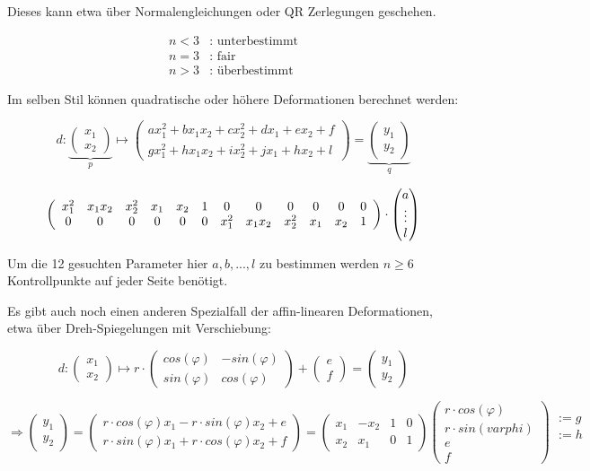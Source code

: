 \documentclass{article}
\theoremstyle{plain}
\theoremstyle{definition}
\numberwithin{equation}{section}
\newcommand{\C}[0]{
    \cdot
}
\newcommand{\x}[0] {
  \boldsymbol{x}
}
\newcommand{\y}[0] {
    \boldsymbol{y}
}
\newcommand{\mat}[1] {
\begin{pmatrix} #1 \end{pmatrix}
}
\begin{document}
Dieses kann etwa über Normalengleichungen oder QR Zerlegungen geschehen.

\begin{align*}
    n<3&\text{: unterbestimmt}\\
    n=3&\text{: fair}\\
    n>3&\text{: überbestimmt}
\end{align*}

Im selben Stil können quadratische oder höhere Deformationen berechnet werden:

\[d:\underbrace{\mat{x_1 \\ x_2}}_{p} \mapsto \mat{ax_1^2 + b x_1 x_2 + c x_2^2 + d x_1 + e x_2 +f\\ g x_1^2 + hx_1x_2 + ix_2^2 + jx_1 + hx_2 +l} = \underbrace{\mat{y_1\\y_2}}_{q}\]

\[\left(
    \begin{array}{*{12}c}
        x_1^2 & x_1x_2 & x_2^2 & x_1 & x_2 & 1 & 0 & 0 & 0 & 0 & 0 & 0\\
        0 & 0 & 0 & 0 & 0 & 0 & x_1^2 & x_1x_2 & x_2^2 & x_1 & x_2 & 1
    \end{array}
    \right) \C \mat{a\\ \vdots \\ l}\]

Um die 12 gesuchten Parameter hier $a,b, ... ,l$ zu bestimmen werden $n \geq 6$ Kontrollpunkte auf jeder Seite benötigt.

Es gibt auch noch einen anderen Spezialfall der affin-linearen Deformationen, etwa über Dreh-Spiegelungen mit Verschiebung:

\[d: \mat{x_1\\x_2} \mapsto r \C \mat{cos(\varphi) & -sin(\varphi)\\ sin(\varphi) & cos(\varphi)} + \mat{e\\f}=\mat{y_1\\y_2}\]

\[\Rightarrow \mat{y_1\\y_2} = \mat{r \C cos(\varphi)x_1 -r \C sin(\varphi)x_2 + e\\ r \C sin(\varphi)x_1 + r \C cos(\varphi) x_2 + f} = \mat{x_1 & -x_2 & 1 & 0\\ x_2 & x_1 & 0 & 1} \mat{r \C cos(\varphi)\\ r \C sin(varphi)\\e \\ f} \begin{array}{c}
    :=g\\:=h\\ \ \\ \
\end{array}\]
\end{document}
